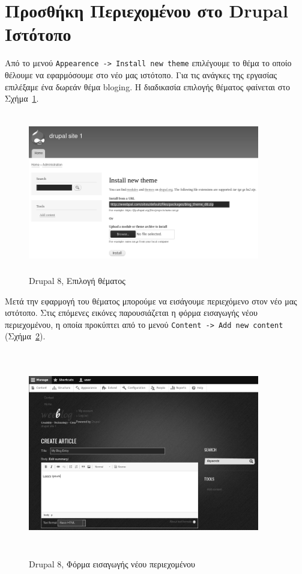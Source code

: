 \documentclass[12pt]{report}
\begin{document}
\section{Προσθήκη Περιεχομένου στο \textlatin{Drupal} Ιστότοπο}
Από το μενού \textlatin{\texttt{Appearence -> Install new theme}} επιλέγουμε το θέμα το οποίο θέλουμε να εφαρμόσουμε στο νέο μας ιστότοπο. Για τις ανάγκες της εργασίας επιλέξαμε ένα δωρεάν θέμα \textlatin{bloging}. Η διαδικασία επιλογής θέματος φαίνεται στο Σχήμα~\ref{fig:drupal_theme}.
\begin{figure}[H]
\centering
\includegraphics[width=0.9\textwidth, height=7cm]{drupal-add-theme-gray}
\caption{\textlatin{Drupal 8}, Επιλογή θέματος}
\label{fig:drupal_theme}
\end{figure}

Μετά την εφαρμογή του θέματος μπορούμε να εισάγουμε περιεχόμενο στον νέο μας ιστότοπο. Στις επόμενες εικόνες παρουσιάζεται η φόρμα εισαγωγής νέου περιεχομένου, η οποία προκύπτει από το μενού \textlatin{\texttt{Content -> Add new content}} (Σχήμα~\ref{fig:drupal_add_content}).
\begin{figure}[H]
\centering
\includegraphics[width=0.9\textwidth, height=9cm]{drupal-add-content-gray}
\caption{\textlatin{Drupal 8}, Φόρμα εισαγωγής νέου περιεχομένου}
\label{fig:drupal_add_content}
\end{figure}
\end{document}
